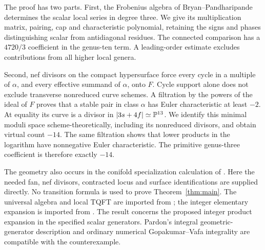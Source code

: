 The proof has two parts. First, the Frobenius algebra of
Bryan--Pandharipande \cite{BP} determines the scalar local series in
degree three. We give its multiplication matrix, pairing, cap and
characteristic polynomial, retaining the signs and phases distinguishing
scalar from antidiagonal residues. The connected comparison has a
$4720/3$ coefficient in the genus-ten term. A leading-order estimate
excludes contributions from all higher local genera.

Second, nef divisors on the compact hypersurface force every cycle
in a multiple of $\alpha$, and every effective summand of $\alpha$,
onto $F$. Cycle support alone does not exclude transverse nonreduced
curve schemes. A filtration by the powers of the ideal of $F$ proves
that a stable pair in class $\alpha$ has Euler characteristic at least
$-2$. At equality its curve is a divisor in $|3s+4f|\simeq\mathbb P^{13}$.
We identify this minimal moduli space scheme-theoretically, including
its nonreduced divisors, and obtain virtual count $-14$. The same
filtration shows that lower products in the logarithm have nonnegative
Euler characteristic. The primitive genus-three coefficient is
therefore exactly $-14$.

The geometry also occurs in the conifold specialization calculation of
\cite{Transition}. Here the needed fan, nef divisors, contracted locus
and surface identifications are supplied directly. No transition
formula is used to prove Theorem~\ref{thm:main}. The universal algebra
and local TQFT are imported from \cite{Pardon,BP}; the integer elementary
expansion is imported from \cite{IP}. The result concerns the proposed
integer product expansion in the specified scalar generators. Pardon's
integral geometric-generator description \cite[Theorem 1.2]{Pardon}
and ordinary numerical Gopakumar--Vafa integrality are compatible with
the counterexample.
